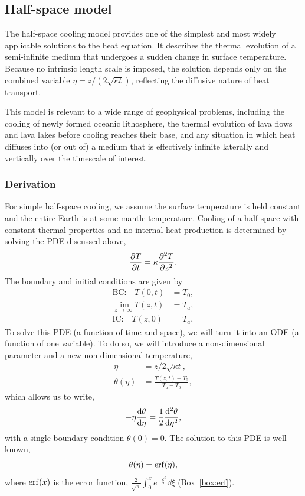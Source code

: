 \subsection{Half-space model}

The half-space cooling model provides one of the simplest and most widely applicable solutions to the heat equation. It describes the thermal evolution of a semi-infinite medium that undergoes a sudden change in surface temperature. Because no intrinsic length scale is imposed, the solution depends only on the combined variable $\eta = z / (2\sqrt{\kappa t})$, reflecting the diffusive nature of heat transport.

This model is relevant to a wide range of geophysical problems, including the cooling of newly formed oceanic lithosphere, the thermal evolution of lava flows and lava lakes before cooling reaches their base, and any situation in which heat diffuses into (or out of) a medium that is effectively infinite laterally and vertically over the timescale of interest.

\subsubsection{Derivation}

For simple half-space cooling, we assume the surface temperature is held constant and the entire Earth is at some mantle temperature.  Cooling of a half-space with constant thermal properties and no internal heat production is determined by solving the PDE discussed above,
\[
    \pdv{T}{t} = \kappa \pdv[2]{T}{z} .
\]
The boundary and initial conditions are given by
\begin{align*}
    \text{BC:} \quad T(0,t) &= T_0 , \\
    \lim_{z \to \infty} T(z,t) &= T_a , \\
    \text{IC:} \quad T(z,0) &= T_a,
\end{align*}
To solve this PDE (a function of time and space), we will turn it into an ODE (a function of one variable).  To do so, we will introduce a non-dimensional parameter and a new non-dimensional temperature,
\begin{align*}
    \eta &= z / 2 \sqrt{\kappa t} , \\
    \theta(\eta) &= \frac{T(z,t) - T_0}{T_a - T_0},
\end{align*}
which allows us to write,
\[
    -\eta \dv{\theta}{\eta} = \frac{1}{2} \dv[2]{\theta}{\eta} ,
\]
with a single boundary condition $\theta(0) = 0$.  The solution to this PDE is well known,
\[
    \theta(\eta) = \erf (\eta) ,
\]
where $\erf (x)$ is the error function,
$\frac{2}{\sqrt{\pi}}\int_0^{x} e^{-\xi^{2}} \dd{\xi}$ (Box~\ref{box:erf}).

